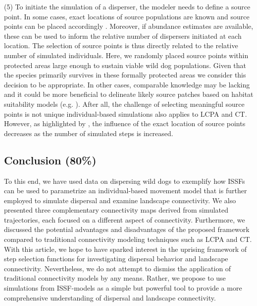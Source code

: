 \documentclass[abstract=on,10pt,a4paper,bibliography=totocnumbered]{article}
\begin{document}
(5) To initiate the simulation of a disperser, the modeler needs to define a
source point. In some cases, exact locations of source populations are known and
source points can be placed accordingly \citep{Kanagaraj.2013}. Moreover, if
abundance estimates are available, these can be used to inform the relative
number of dispersers initiated at each location. The selection of source points
is thus directly related to the relative number of simulated individuals. Here,
we randomly placed source points within protected areas large enough to sustain
viable wild dog populations. Given that the species primarily survives in these
formally protected areas \citep{Woodroffe.1999, DaviesMostert.2012,
Woodroffe.2012, VanDerMeer.2014} we consider this decision to be appropriate. In
other cases, comparable knowledge may be lacking and it could be more beneficial
to delineate likely source patches based on habitat suitability models (e.g.
\citealp{Squires.2013}). After all, the challenge of selecting meaningful source
points is not unique individual-based simulations also applies to LCPA and
CT. However, as highlighted by \cite{Signer.2017}, the influence of the exact
location of source points decreases as the number of simulated steps is
increased.

\subsection{Conclusion (80\%)}
To this end, we have used data on dispersing wild dogs to exemplify how ISSFs
can be used to parametrize an individual-based movement model that is further
employed to simulate dispersal and examine landscape connectivity. We also
presented three complementary connectivity maps derived from simulated
trajectories, each focused on a different aspect of connectivity. Furthermore,
we discussed the potential advantages and disadvantages of the proposed
framework compared to traditional connectivity modeling techniques such as LCPA
and CT. With this article, we hope to have sparked interest in the uprising
framework of step selection functions for investigating dispersal behavior and
landscape connectivity. Nevertheless, we do not attempt to dismiss the
application of traditional connectivity models by any means. Rather, we propose
to use simulations from ISSF-models as a simple but powerful tool to provide a
more comprehensive understanding of dispersal and landscape connectivity.
\end{document}

